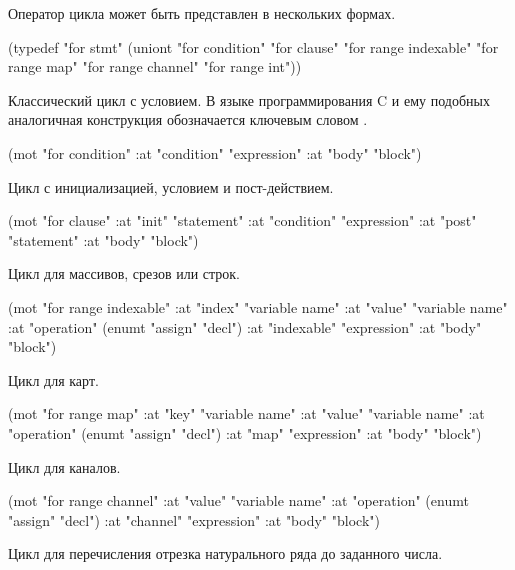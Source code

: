 \documentclass[12pt,twoside,russian]{article}
\newcommand{\textGoKeyword}[1]{{\color{goPurple}\textbf{#1}}}
\newcommand{\textABMLString}[1]{{\color{abmlString}#1}}
\newcommand{\GoKeyword}[1]{\goinline{\textGoKeyword{#1}}}
\newcommand{\ABMLString}[1]{\abmlinline{\textABMLString{#1}}}
\begin{document}
Оператор цикла может быть представлен в нескольких формах.

\begin{ABMLCode}
(typedef "for stmt" (uniont "for condition" "for clause" 
                            "for range indexable" "for range map" 
                            "for range channel" "for range int"))
\end{ABMLCode}

Классический цикл с условием. В языке программирования C и ему подобных аналогичная конструкция обозначается ключевым словом \ABMLString{while}.

\begin{ABMLCode}
(mot "for condition"
     :at "condition" "expression" 
     :at "body"      "block")
\end{ABMLCode}

Цикл с инициализацией, условием и пост-действием.

\begin{ABMLCode}
(mot "for clause"
	:at "init"      "statement"
	:at "condition" "expression" 
	:at "post"      "statement" 
	:at "body"      "block")
\end{ABMLCode}

Цикл \GoKeyword{range} для массивов, срезов или строк.

\begin{ABMLCode}
(mot "for range indexable"
	:at "index"     "variable name"
	:at "value"     "variable name"
	:at "operation" (enumt "assign" "decl")
	:at "indexable" "expression"
	:at "body"      "block")
\end{ABMLCode}

Цикл \GoKeyword{range} для карт.

\begin{ABMLCode}
(mot "for range map"
	:at "key"       "variable name"
	:at "value"     "variable name"
	:at "operation" (enumt "assign" "decl")
	:at "map"       "expression"
	:at "body"      "block")
\end{ABMLCode}

Цикл \GoKeyword{range} для каналов.

\begin{ABMLCode}
(mot "for range channel"
	:at "value"     "variable name"
	:at "operation" (enumt "assign" "decl")
	:at "channel"   "expression" 
	:at "body"      "block")
\end{ABMLCode}

Цикл \GoKeyword{range} для перечисления отрезка натурального ряда до заданного числа.
\end{document}
